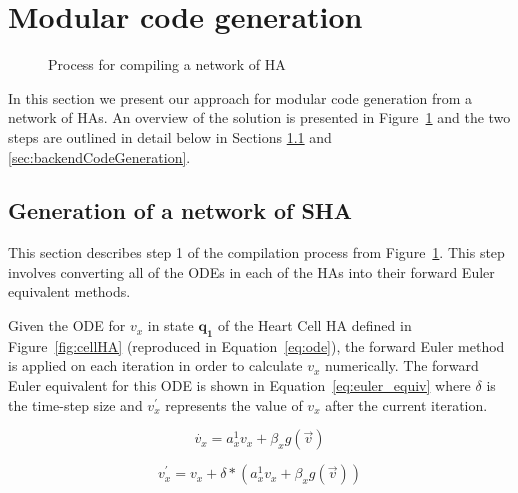 \section{Modular code generation}
\label{sec:codeGen}

\begin{figure}[t!]
	\centering
	\scalebox{0.7}{
		
	}
	\caption{Process for compiling a network of \acf{HA}}
	\label{fig:compilingHA}
\end{figure}

%	

In this section we present our approach for modular code generation from
a network of \acp{HA}. 
An overview of the solution is presented in Figure~\ref{fig:compilingHA} and the two steps are outlined in detail below in Sections \ref{sec:shaGeneration} and \ref{sec:backendCodeGeneration}.

\subsection{Generation of a network of \ac{SHA}}
\label{sec:shaGeneration}

This section describes step 1 of the compilation process from Figure~\ref{fig:compilingHA}.
This step involves converting all of the \acp{ODE} in each of the \acp{HA} into their forward Euler equivalent methods.

Given the \ac{ODE} for $v_x$ in state $\mathbf{q_1}$ of the Heart Cell \ac{HA} defined in Figure~\ref{fig:cellHA} (reproduced in Equation~\ref{eq:ode}), the forward Euler method is applied on each iteration in order to calculate $v_x$ numerically.
The forward Euler equivalent for this ODE is shown in Equation~\ref{eq:euler_equiv} where $\delta$ is the time-step size and $v^\prime_x$ represents the value of $v_x$ after the current iteration.

\begin{equation}
\dot{v_x} = a^1_x v_x + \beta_x g(\vec{v})
\label{eq:ode}
\end{equation}

\begin{equation}
v^\prime_x = v_x + \delta * (a^1_x v_x + \beta_x g(\vec{v}))
\label{eq:euler_equiv}
\end{equation}

